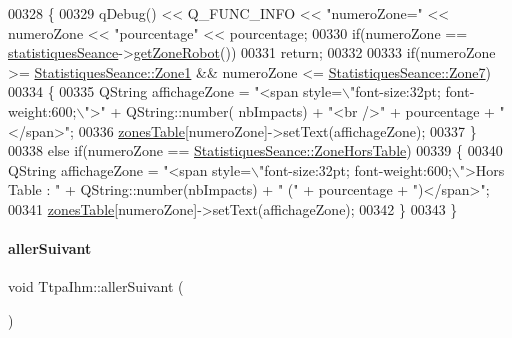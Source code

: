 \begin{DoxyCode}
00328 \{
00329     qDebug() << Q\_FUNC\_INFO << \textcolor{stringliteral}{"numeroZone="} << numeroZone << \textcolor{stringliteral}{"pourcentage"} << pourcentage;
00330     \textcolor{keywordflow}{if}(numeroZone == \hyperlink{class_ttpa_ihm_abed6897d6f7b4d3a5eb8dcc07651e740}{statistiquesSeance}->\hyperlink{class_statistiques_seance_ad1bdc22fbd9f37fab06d9fc24e9f1bc4}{getZoneRobot}())
00331         \textcolor{keywordflow}{return};
00332 
00333     \textcolor{keywordflow}{if}(numeroZone >= \hyperlink{class_statistiques_seance_aa839f5192cbadd7c3fb3651d62eff8b5a3aa1c8dd53092c489bf5b27952c898ac}{StatistiquesSeance::Zone1} && numeroZone <= 
      \hyperlink{class_statistiques_seance_aa839f5192cbadd7c3fb3651d62eff8b5a196adb885d7fd7109e451e759564ea64}{StatistiquesSeance::Zone7})
00334     \{
00335         QString affichageZone = \textcolor{stringliteral}{"<span style=\(\backslash\)"font-size:32pt; font-weight:600;\(\backslash\)">"} + QString::number(
      nbImpacts) + \textcolor{stringliteral}{"<br />"} + pourcentage + \textcolor{stringliteral}{"</span>"};
00336         \hyperlink{class_ttpa_ihm_af77d75f1aa3eb901b9410e5fc465ece8}{zonesTable}[numeroZone]->setText(affichageZone);
00337     \}
00338     \textcolor{keywordflow}{else} \textcolor{keywordflow}{if}(numeroZone == \hyperlink{class_statistiques_seance_aa839f5192cbadd7c3fb3651d62eff8b5aeb6ef225df9153e1f46a968ae71bf2f3}{StatistiquesSeance::ZoneHorsTable})
00339     \{
00340         QString affichageZone = \textcolor{stringliteral}{"<span style=\(\backslash\)"font-size:32pt; font-weight:600;\(\backslash\)">Hors Table : "} + 
      QString::number(nbImpacts) + \textcolor{stringliteral}{" ("} + pourcentage + \textcolor{stringliteral}{")</span>"};
00341         \hyperlink{class_ttpa_ihm_af77d75f1aa3eb901b9410e5fc465ece8}{zonesTable}[numeroZone]->setText(affichageZone);
00342     \}
00343 \}
\end{DoxyCode}
\mbox{\label{class_ttpa_ihm_a647bfb1ce10f8ac4b1294a880a76f3d2}} 
\paragraph{\texorpdfstring{aller\+Suivant}{allerSuivant}}
{\footnotesize\ttfamily void Ttpa\+Ihm\+::aller\+Suivant (\begin{DoxyParamCaption}{ }\end{DoxyParamCaption})\hspace{0.3cm}{\ttfamily [slot]}}



